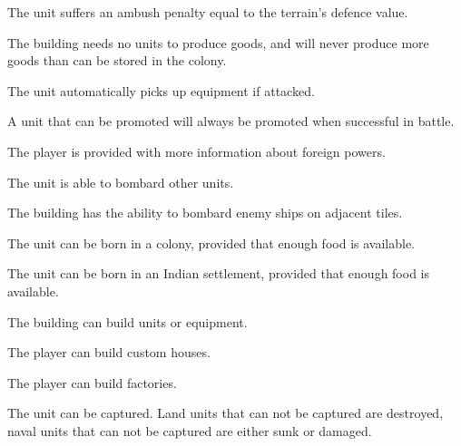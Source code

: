 \documentclass[12pt]{book}
\begin{document}
The unit suffers an ambush penalty equal to the terrain's defence value.

\affectsBuilding

The building needs no units to produce goods, and will never produce
more goods than can be stored in the colony.

\affectsUnit

The unit automatically picks up equipment if attacked.

\affectsUnit

A unit that can be promoted will always be promoted when successful in
battle.

\affectsPlayer

The player is provided with more information about foreign powers.

\affectsUnit

The unit is able to bombard other units.

\affectsBuilding

The building has the ability to bombard enemy ships on adjacent tiles.

\affectsUnit

The unit can be born in a colony, provided that enough food is available.

\affectsUnit

The unit can be born in an Indian settlement, provided that enough food is available.

\affectsBuilding

The building can build units or equipment.

\affectsPlayer

The player can build custom houses.

\affectsPlayer

The player can build factories.

\affectsUnit

The unit can be captured. Land units that can not be captured are
destroyed, naval units that can not be captured are either sunk or
damaged.

\affectsUnit
\end{document}

